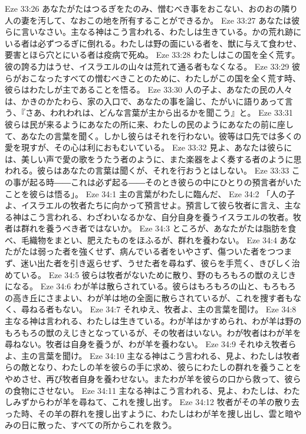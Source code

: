 Eze 33:26  あなたがたはつるぎをたのみ、憎むべき事をおこない、おのおの隣り人の妻を汚して、なおこの地を所有することができるか。
Eze 33:27  あなたは彼らに言いなさい。主なる神はこう言われる、わたしは生きている。かの荒れ跡にいる者は必ずつるぎに倒れる。わたしは野の面にいる者を、獣に与えて食わせ、要害とほら穴とにいる者は疫病で死ぬ。
Eze 33:28  わたしはこの国を全く荒す。彼の誇る力はうせ、イスラエルの山々は荒れて通る者もなくなる。
Eze 33:29  彼らがおこなったすべての憎むべきことのために、わたしがこの国を全く荒す時、彼らはわたしが主であることを悟る。
Eze 33:30  人の子よ、あなたの民の人々は、かきのかたわら、家の入口で、あなたの事を論じ、たがいに語りあって言う、『さあ、われわれは、どんな言葉が主から出るかを聞こう』と。
Eze 33:31  彼らは民が来るようにあなたの所に来、わたしの民のようにあなたの前に座して、あなたの言葉を聞く。しかし彼らはそれを行わない。彼等は口先では多くの愛を現すが、その心は利におもむいている。
Eze 33:32  見よ、あなたは彼らには、美しい声で愛の歌をうたう者のように、また楽器をよく奏する者のように思われる。彼らはあなたの言葉は聞くが、それを行おうとはしない。
Eze 33:33  この事が起る時――これは必ず起る――そのとき彼らの中にひとりの預言者がいたことを彼らは悟る」。
Eze 34:1  主の言葉がわたしに臨んだ、
Eze 34:2  「人の子よ、イスラエルの牧者たちに向かって預言せよ。預言して彼ら牧者に言え、主なる神はこう言われる、わざわいなるかな、自分自身を養うイスラエルの牧者。牧者は群れを養うべき者ではないか。
Eze 34:3  ところが、あなたがたは脂肪を食べ、毛織物をまとい、肥えたものをほふるが、群れを養わない。
Eze 34:4  あなたがたは弱った者を強くせず、病んでいる者をいやさず、傷ついた者をつつまず、迷い出た者を引き返らせず、うせた者を尋ねず、彼らを手荒く、きびしく治めている。
Eze 34:5  彼らは牧者がないために散り、野のもろもろの獣のえじきになる。
Eze 34:6  わが羊は散らされている。彼らはもろもろの山と、もろもろの高き丘にさまよい、わが羊は地の全面に散らされているが、これを捜す者もなく、尋ねる者もない。
Eze 34:7  それゆえ、牧者よ、主の言葉を聞け。
Eze 34:8  主なる神は言われる、わたしは生きている。わが羊はかすめられ、わが羊は野のもろもろの獣のえじきとなっているが、その牧者はいない。わが牧者はわが羊を尋ねない。牧者は自身を養うが、わが羊を養わない。
Eze 34:9  それゆえ牧者らよ、主の言葉を聞け。
Eze 34:10  主なる神はこう言われる、見よ、わたしは牧者らの敵となり、わたしの羊を彼らの手に求め、彼らにわたしの群れを養うことをやめさせ、再び牧者自身を養わせない。またわが羊を彼らの口から救って、彼らの食物にさせない。
Eze 34:11  主なる神はこう言われる、見よ、わたしは、わたしみずからわが羊を尋ねて、これを捜し出す。
Eze 34:12  牧者がその羊の散り去った時、その羊の群れを捜し出すように、わたしはわが羊を捜し出し、雲と暗やみの日に散った、すべての所からこれを救う。
